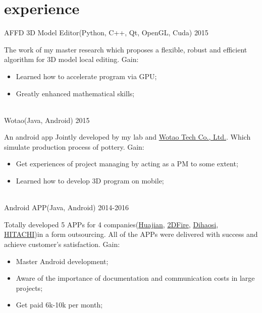 \documentclass[print]{friggeri-cv} %
\begin{document}
\section{experience}
\begin{entrylist}
\entryact
{AFFD 3D Model Editor(Python, C++, Qt, OpenGL, Cuda)}
{2015}
{The work of my master research which proposes a flexible, robust and efficient algorithm for 3D model local editing. Gain:
\begin{itemize}
    \item Learned how to accelerate program via GPU;
    \item Greatly enhanced mathematical skills;
\end{itemize}}
\\
\entryact
{Wotao(Java, Android)}
{2015}
{An android app Jointly developed by my lab and \href{http://wowtao.me/index.html}{Wotao Tech Co., Ltd.}. Which simulate production process of pottery. Gain:
\begin{itemize}
    \item Get experiences of project managing by acting as a PM to some extent;
    \item Learned how to develop 3D program on mobile;
\end{itemize}}
\\
\entryact
{Android APP(Java, Android)}
{2014-2016}
{Totally developed 5 APPs for 4 companies(\href{http://www.hjtechcn.cn/}{Huajian}, \href{http://www.2dfire.com/}{2DFire}, \href{http://d-controls.com/}{Dihaosi}, \href{http://www.hisensehitachi.com/}{HITACHI})in a form outsourcing. All of the APPs were delivered with success and achieve customer's satisfaction. Gain:
\begin{itemize}
    \item Master Android development;
    \item Aware of the importance of documentation and communication costs in large projects;
    \item Get paid 6k-10k per month;
\end{itemize}}

\end{entrylist}
\end{document}
